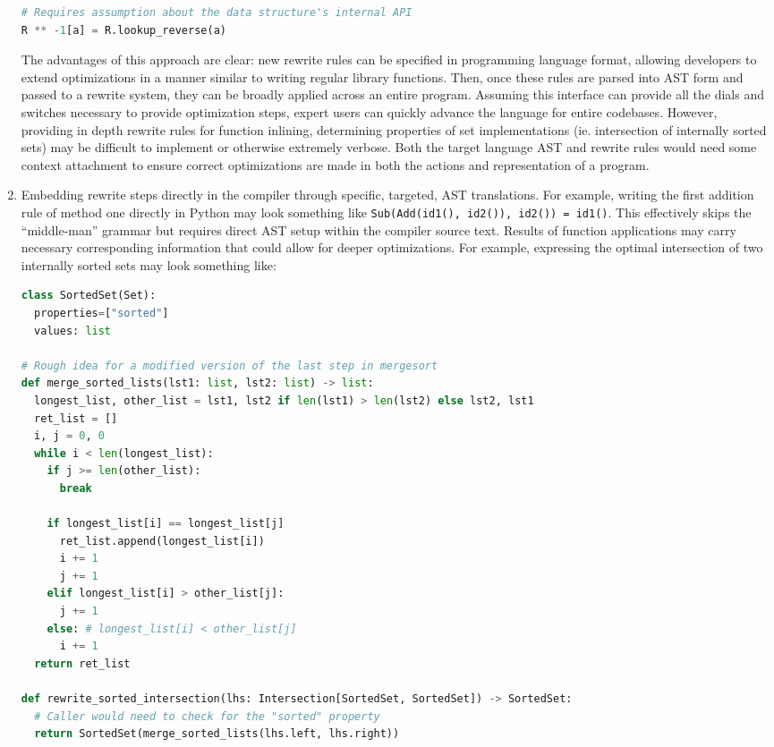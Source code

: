 \documentclass{article}
\begin{document}
\begin{enumerate}
\begin{lstlisting}[language=python]
# Requires assumption about the data structure's internal API
R ** -1[a] = R.lookup_reverse(a)
\end{lstlisting}
  The advantages of this approach are clear: new rewrite rules can be specified in programming language format, allowing developers to extend optimizations in a manner similar to writing regular library functions. Then, once these rules are parsed into AST form and passed to a rewrite system, they can be broadly applied across an entire program. Assuming this interface can provide all the dials and switches necessary to provide optimization steps, expert users can quickly advance the language for entire codebases. However, providing in depth rewrite rules for function inlining, determining properties of set implementations (ie. intersection of internally sorted sets) may be difficult to implement or otherwise extremely verbose. Both the target language AST and rewrite rules would need some context attachment to ensure correct optimizations are made in both the actions and representation of a program.
  \item Embedding rewrite steps directly in the compiler through specific, targeted, AST translations. For example, writing the first addition rule of method one directly in Python may look something like \texttt{Sub(Add(id1(), id2()), id2()) = id1()}. This effectively skips the ``middle-man'' grammar but requires direct AST setup within the compiler source text. Results of function applications may carry necessary corresponding information that could allow for deeper optimizations. For example, expressing the optimal intersection of two internally sorted sets may look something like:
  \begin{lstlisting}[language=python]
class SortedSet(Set):
  properties=["sorted"]
  values: list

# Rough idea for a modified version of the last step in mergesort
def merge_sorted_lists(lst1: list, lst2: list) -> list:
  longest_list, other_list = lst1, lst2 if len(lst1) > len(lst2) else lst2, lst1
  ret_list = []
  i, j = 0, 0
  while i < len(longest_list):
    if j >= len(other_list):
      break

    if longest_list[i] == longest_list[j]
      ret_list.append(longest_list[i])
      i += 1
      j += 1
    elif longest_list[i] > other_list[j]:
      j += 1
    else: # longest_list[i] < other_list[j]
      i += 1
  return ret_list

def rewrite_sorted_intersection(lhs: Intersection[SortedSet, SortedSet]) -> SortedSet:
  # Caller would need to check for the "sorted" property
  return SortedSet(merge_sorted_lists(lhs.left, lhs.right))
\end{lstlisting}
\end{enumerate}
\end{document}
